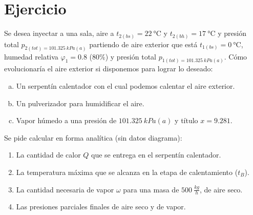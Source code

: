 \section{Ejercicio}\label{ej:Chap12Ejercicio10}
Se desea inyectar a una sala, aire a $t_{2(bs)}=\SI{22}{\celsius}$ y $t_{2(bh)}=\SI{17}{\celsius}$ y presión total $p_{2(tot)=\SI{101.325}{kPa(a)}}$ partiendo de aire exterior que está $t_{1(bs)}=\SI{0}{\celsius}$, humedad relativa $\varphi_1=0.8$ ($80\%$) y presión total $p_{1(tot)=\SI{101.325}{kPa(a)}}$. Cómo evolucionaría el aire exterior si disponemos para lograr lo deseado:
\begin{enumerate}[a)]
    \item Un serpentín calentador con el cual podemos calentar el aire exterior.
    \item Un pulverizador para humidificar el aire.
    \item Vapor húmedo a una presión de $\SI{101.325}{kPa(a)}$ y título $x=9.281$.
\end{enumerate}

Se pide calcular en forma analítica (sin datos diagrama):
\begin{enumerate}
    \item La cantidad de calor $Q$ que se entrega en el serpentín calentador.
    \item La temperatura máxima que se alcanza en la etapa de calentamiento ($t_B$).
    \item La cantidad necesaria de vapor $\omega$ para una masa de $\SI{500}{\frac{kg}{h}}$, de aire seco.
    \item Las presiones parciales finales de aire seco y de vapor.
\end{enumerate}